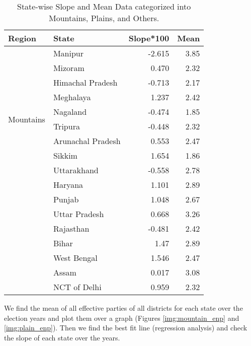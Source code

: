 \begin{table}[h!]
\centering
\begin{tabular}{|l|l|r|r|}
\hline
\textbf{Region} & \textbf{State} & \textbf{Slope*100} & \textbf{Mean} \\ \hline
\multirow{10}{*}{Mountains} & Manipur & -2.615 & 3.85 \\ \cline{2-4}
& Mizoram & 0.470 & 2.32 \\ \cline{2-4}
& Himachal Pradesh & -0.713 & 2.17 \\ \cline{2-4}
& Meghalaya & 1.237 & 2.42 \\ \cline{2-4}
& Nagaland & -0.474 & 1.85 \\ \cline{2-4}
& Tripura & -0.448 & 2.32 \\ \cline{2-4}
& Arunachal Pradesh & 0.553 & 2.47 \\ \cline{2-4}
& Sikkim & 1.654 & 1.86 \\ \cline{2-4}
& Uttarakhand & -0.558 & 2.78 \\ \hline
\multirow{8}{*}{Plains} & Haryana & 1.101 & 2.89 \\ \cline{2-4}
& Punjab & 1.048 & 2.67 \\ \cline{2-4}
& Uttar Pradesh & 0.668 & 3.26 \\ \cline{2-4}
& Rajasthan & -0.481 & 2.42 \\ \cline{2-4}
& Bihar & 1.47 & 2.89 \\ \cline{2-4}
& West Bengal & 1.546 & 2.47 \\ \cline{2-4}
& Assam & 0.017 & 3.08 \\ \cline{2-4}
& NCT of Delhi & 0.959 & 2.32 \\ \hline
\end{tabular}
\caption{State-wise Slope and Mean Data categorized into Mountains, Plains, and Others.}
\label{tab:state_data}
\end{table}
\vspace{0.3cm} 
We find the mean of all effective parties of all districts for each state over the election years and plot them over a graph (Figures \ref{img:mountain_enp} and \ref{img:plain_enp}). Then we find the best fit line (regression analysis) and check the slope of each state over the years.

\vspace{0.3cm}

